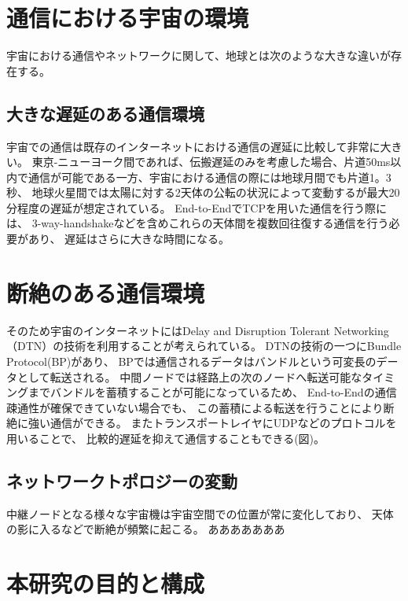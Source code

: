 \section{通信における宇宙の環境}
宇宙における通信やネットワークに関して、地球とは次のような大きな違いが存在する。
\subsection{大きな遅延のある通信環境}
宇宙での通信は既存のインターネットにおける通信の遅延に比較して非常に大きい。
東京-ニューヨーク間であれば、伝搬遅延のみを考慮した場合、片道50ms以内で通信が可能である一方、宇宙における通信の際には地球月間でも片道1。3秒、
地球火星間では太陽に対する2天体の公転の状況によって変動するが最大20分程度の遅延が想定されている。\cite{doi:10.2514/6.2022-4239}
End-to-EndでTCPを用いた通信を行う際には、 3-way-handshakeなどを含めこれらの天体間を複数回往復する通信を行う必要があり、 
遅延はさらに大きな時間になる。 

\section{断絶のある通信環境}    
そのため宇宙のインターネットにはDelay and Disruption Tolerant Networking（DTN）の技術を利用することが考えられている。 
DTNの技術の一つにBundle Protocol(BP)があり、 BPでは通信されるデータはバンドルという可変長のデータとして転送される。 
中間ノードでは経路上の次のノードへ転送可能なタイミングまでバンドルを蓄積することが可能になっているため、 
End-to-Endの通信疎通性が確保できていない場合でも、 この蓄積による転送を行うことにより断絶に強い通信ができる。
 またトランスポートレイヤにUDPなどのプロトコルを用いることで、 
 比較的遅延を抑えて通信することもできる(図)。

\subsection{ネットワークトポロジーの変動}
中継ノードとなる様々な宇宙機は宇宙空間での位置が常に変化しており、
 天体の影に入るなどで断絶が頻繁に起こる。 
あああああああ
\section{本研究の目的と構成}